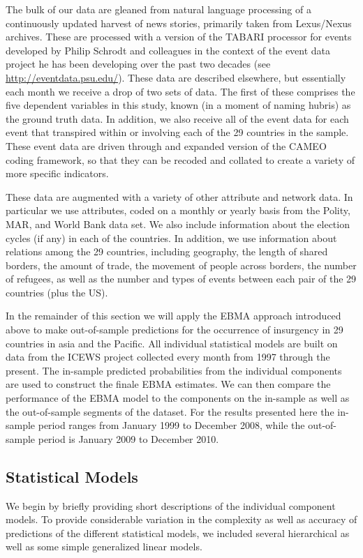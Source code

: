 \documentclass[pdftex,12pt,fullpage,oneside]{amsart}
\begin{document}
The bulk of our data are gleaned from natural language processing of a
continuously updated harvest of news stories, primarily taken from
Lexus/Nexus archives. These are processed with a version of the TABARI
processor for events developed by Philip Schrodt and colleagues in the
context of the event data project he has been developing over the past
two decades (see \url{http://eventdata.psu.edu/}). These data are
described elsewhere, but essentially each month we receive a drop of
two sets of data. The first of these comprises the five dependent
variables in this study, known (in a moment of naming hubris) as the
ground truth data. In addition, we also receive all of the event data
for each event that transpired within or involving each of the 29
countries in the sample.  These event data are driven through and
expanded version of the CAMEO coding framework, so that they can be
recoded and collated to create a variety of more specific indicators.

These data are augmented with a variety of other attribute and network
data.  In particular we use attributes, coded on a monthly or yearly
basis from the Polity, MAR, and World Bank data set. We also include
information about the election cycles (if any) in each of the
countries. In addition, we use information about relations among the
29 countries, including geography, the length of shared borders, the
amount of trade, the movement of people across borders, the number of
refugees, as well as the number and types of events between each pair
of the 29 countries (plus the US). 

In the remainder of this section we will apply the EBMA approach
introduced above to make out-of-sample predictions for the occurrence
of insurgency in 29 countries in asia and the Pacific. All individual
statistical models are built on data from the ICEWS project collected
every month from 1997 through the present. The in-sample predicted
probabilities from the individual components are used to construct the
finale EBMA estimates. We can then compare the performance of the EBMA
model to the components on the in-sample as well as the out-of-sample
segments of the dataset. For the results presented here the in-sample
period ranges from January 1999 to December 2008, while the
out-of-sample period is January 2009 to December 2010.

\subsection{Statistical Models}
We begin by briefly providing short descriptions of the individual
component models. To provide considerable variation in the complexity
as well as accuracy of predictions of the different statistical
models, we included several hierarchical as well as some simple
generalized linear models.
\end{document}
